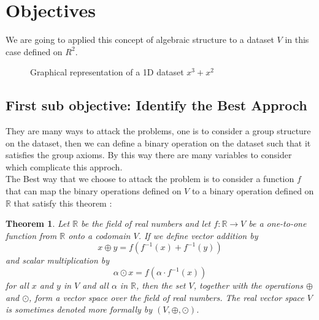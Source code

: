 \documentclass{report}
\newtheorem{theorem}{Theorem}[section]
\begin{document}
\section{Objectives}
    We are going to applied this concept of algebraic structure
    to a dataset $V$ in this case defined on $R^2$. 
    \begin{figure}[h]
    \centering
    \caption{Graphical representation of a 1D dataset $x^3 + x^2$ }
    \end{figure}
    \subsection{First sub objective: Identify the Best Approch}




        
    They are many ways to attack the problems, one is to consider a group structure on the dataset, then we can define a binary operation on the dataset such that it satisfies the group axioms.
    By this way there are many variables to consider which complicate this approch.
    \\
    The Best way that we choose to attack the problem  is to consider a function $f$ that can map the binary operations defined on $V$ to a binary operation defined on $\mathbb{R}$ that satisfy this theorem :
    \\
        \begin{theorem}\label{thm:1}
            \rm{Let $\mathbb{R}$ be the field of real numbers and let $f: \mathbb{R} \rightarrow V$ be a one-to-one function from $\mathbb{R}$ onto a codomain $V$. If we define vector addition by
            $$
            x \oplus y=f\left(f^{-1}(x)+f^{-1}(y)\right)
            $$
            and scalar multiplication by
            $$
            \alpha \odot x=f\left(\alpha \cdot f^{-1}(x)\right)
            $$
            for all $x$ and $y$ in $V$ and all $\alpha$ in $\mathbb{R}$, then the set $V$, together with the operations $\oplus$ and $\odot$, form a vector space over the field of real numbers.
            The real vector space $V$ is sometimes denoted more formally by $(V, \oplus, \odot)$.}
        \end{theorem}
\end{document}
